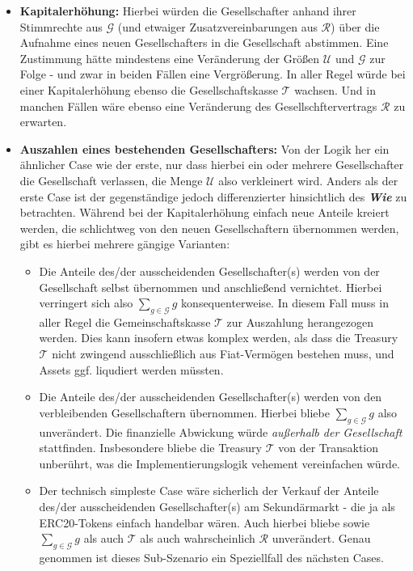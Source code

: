 \begin{Fazit}
\begin{itemize}
  \item \textbf{Kapitalerhöhung:} Hierbei würden die Gesellschafter anhand ihrer Stimmrechte aus $\mathcal{G}$ (und etwaiger Zusatzvereinbarungen aus $\mathcal{R}$) über die Aufnahme eines neuen Gesellschafters in die Gesellschaft abstimmen. Eine Zustimmung hätte mindestens eine Veränderung der Größen $\mathcal{U}$ und $\mathcal{G}$ zur Folge - und zwar in beiden Fällen eine Vergrößerung. In aller Regel würde bei einer Kapital\-erhöhung ebenso die Gesellschaftskasse $\mathcal{T}$ wachsen. Und in manchen Fällen wäre ebenso eine Veränderung des Gesellschftervertrags $\mathcal{R}$ zu erwarten.
  \item \textbf{Auszahlen eines bestehenden Gesellschafters:} Von der Logik her ein ähnlicher Case wie der erste, nur dass hierbei ein oder mehrere Gesellschafter die Gesellschaft verlassen, die Menge $\mathcal{U}$ also verkleinert wird. Anders als der erste Case ist der gegenständige jedoch differenzierter hinsichtlich des \textit{\textbf{Wie}} zu betrachten. Während bei der Kapitalerhöhung einfach neue Anteile kreiert werden, die schlichtweg von den neuen Gesellschaftern übernommen werden, gibt es hierbei mehrere gängige Varianten:
  \begin{itemize}
	\item Die Anteile des/der ausscheidenden Gesellschafter(s) werden von der Gesell\-schaft selbst übernommen und anschließend vernichtet. Hierbei verringert sich also $\sum_{g \in \mathcal{G}}g$ konsequenterweise. In diesem Fall muss in aller Regel die Gemeinschaftskasse $\mathcal{T}$ zur Auszahlung herangezogen werden. Dies kann insofern etwas komplex werden, als dass die Treasury $\mathcal{T}$ nicht zwingend ausschließlich aus Fiat-Vermögen bestehen muss, und Assets ggf. liqudiert werden müssten.
	\item Die Anteile des/der ausscheidenden Gesellschafter(s) werden von den verbleibenden Gesellschaftern übernommen. Hierbei bliebe $\sum_{g \in \mathcal{G}}g$ also unverändert. Die finanzielle Abwickung würde \textit{außerhalb der Gesellschaft} stattfinden. Insbesondere bliebe die Treasury $\mathcal{T}$ von der Transaktion unberührt, was die Implementierungslogik vehement vereinfachen würde.
	\item Der technisch simpleste Case wäre sicherlich der Verkauf der Anteile des/der ausscheidenden Gesellschafter(s) am Sekundärmarkt - die ja als ERC20-Tokens einfach handelbar wären. Auch hierbei bliebe sowie $\sum_{g \in \mathcal{G}}g$ als auch $\mathcal{T}$ als auch wahrscheinlich $\mathcal{R}$ unverändert. Genau genommen ist dieses Sub-Szenario ein Speziellfall des nächsten Cases.

\end{itemize}
\end{itemize}
\end{Fazit}

